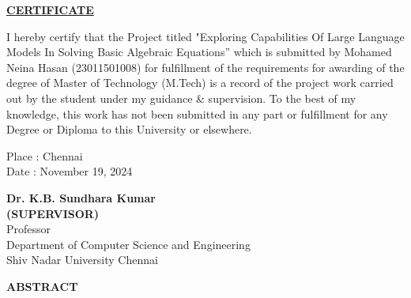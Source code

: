 \documentclass[12pt,a4paper]{report}
\begin{document}

\newpage

\vspace{2cm}
\begin{center}
 \textbf{\underline {CERTIFICATE}}
\end{center}
I hereby certify that the Project titled "Exploring Capabilities Of Large Language Models In Solving Basic Algebraic Equations” which is submitted by Mohamed Neina Hasan (23011501008) for fulfillment of the requirements for awarding of the degree of Master of Technology (M.Tech) is a record of the project work carried out by the student under my guidance \& supervision. To the best of my knowledge, this work has not been submitted in any part or fulfillment for any Degree or Diploma to this University or elsewhere.

\noindent \begin{minipage}{4cm}
\begin{flushleft}
\vspace{1 cm}
                         
Place : Chennai \\
Date : November 19, 2024 \\

\end{flushleft} 
\end{minipage}
\hfill
\begin{minipage}{10cm}
\begin{flushright}                                      
\vspace{2cm}

\vspace{.8cm}
\textbf{Dr. K.B. Sundhara Kumar}\\
\textbf{(SUPERVISOR)}\\
Professor\\
Department of Computer Science and Engineering\\
Shiv Nadar University Chennai\\
\end{flushright} 
\end{minipage}
\newpage

\begin{center} \textbf{ABSTRACT}  \end{center}
\end{document}
